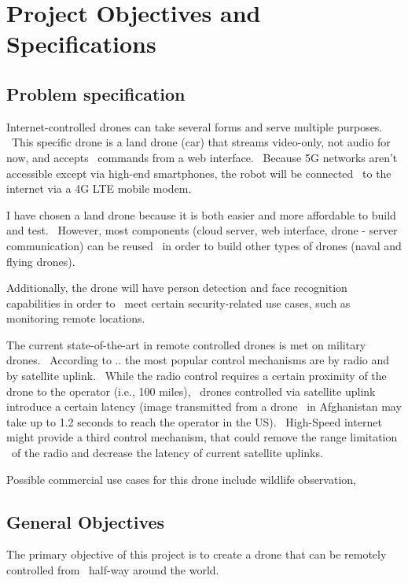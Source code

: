 

\chapter{Project Objectives and Specifications}
\label{ch:specification}

\section{Problem specification}
\label{sec:specification-specification}

Internet-controlled drones can take several forms and serve multiple purposes. \
This specific drone is a land drone (car) that streams video-only, not audio for now, and accepts \
commands from a web interface. \
Because 5G networks aren't accessible except via high-end smartphones, the robot will be connected \
to the internet via a 4G LTE mobile modem.

I have chosen a land drone because it is both easier and more affordable to build and test. \
However, most components (cloud server, web interface, drone - server communication) can be reused \
in order to build other types of drones (naval and flying drones).

Additionally, the drone will have person detection and face recognition capabilities in order to \
meet certain security-related use cases, such as monitoring remote locations.

The current state-of-the-art in remote controlled drones is met on military drones. \
According to .. %
the most popular control mechanisms are by radio and by satellite uplink. \
While the radio control requires a certain proximity of the drone to the operator (i.e., 100 miles), \
drones controlled via satellite uplink introduce a certain latency (image transmitted from a drone \
in Afghanistan may take up to 1.2 seconds to reach the operator in the US). \
High-Speed internet might provide a third control mechanism, that could remove the range limitation \
of the radio and decrease the latency of current satellite uplinks.

Possible commercial use cases for this drone include wildlife observation,


\section{General Objectives}
\label{sec:specification-objectives}
The primary objective of this project is to create a drone that can be remotely controlled from \
half-way around the world.

